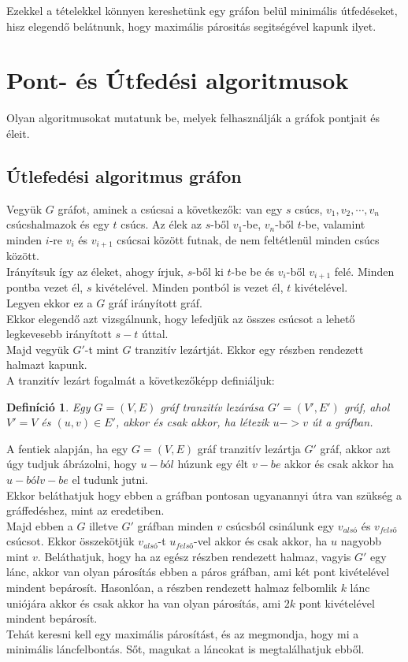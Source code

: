 \documentclass[12pt]{article}
\newtheorem{defin}{Definíció}[section]
\begin{document}
Ezekkel a tételekkel könnyen kereshetünk egy gráfon belül minimális útfedéseket, hisz elegendő belátnunk, hogy maximális párositás segitségével kapunk ilyet.


\section{Pont- és Útfedési algoritmusok}

Olyan algoritmusokat mutatunk be, melyek felhasználják a gráfok pontjait és éleit.

\subsection{Útlefedési algoritmus gráfon}

Vegyük $G$ gráfot, aminek a csúcsai a következők:
van egy $s$ csúcs, $v_1, v_2, \cdots, v_n$ csúcshalmazok és egy $t$ csúcs.
Az élek az $s$-ből $v_1$-be, $v_n$-ből $t$-be, valamint minden $i$-re $v_i$ és $v_{i+1}$ csúcsai között futnak, de nem feltétlenül minden csúcs között.\\
Irányítsuk így az éleket, ahogy írjuk, $s$-ből ki $t$-be be és $v_i$-ből $v_{i+1}$ felé. Minden pontba vezet él, $s$ kivételével. Minden pontból is vezet él, $t$ kivételével.\\
Legyen ekkor ez a $G$ gráf irányított gráf.\\
Ekkor elegendő azt vizsgálnunk, hogy lefedjük az összes csúcsot a lehető legkevesebb irányított $s-t$ úttal.\\
Majd vegyük $G'$-t mint $G$ tranzitív lezártját. Ekkor egy részben rendezett halmazt kapunk.\\

A tranzitív lezárt fogalmát a következőképp definiáljuk:

\begin{defin}
Egy $G = (V,E)$ gráf tranzitív lezárása $G' = (V',E')$ gráf, ahol $V' = V$ és $(u,v) \in E'$, akkor és csak akkor, ha létezik $u -> v$ út a gráfban.
\end{defin}

A fentiek alapján, ha egy $G = (V,E)$ gráf tranzitív lezártja $G'$ gráf, akkor azt úgy tudjuk ábrázolni, hogy $u-ból$ húzunk egy élt $v-be$ akkor és csak akkor ha $u-ból v-be$ el tudunk jutni.\\

Ekkor beláthatjuk hogy ebben a gráfban pontosan ugyanannyi útra van szükség a gráffedéshez, mint az eredetiben.\\
Majd ebben a $G$ illetve $G'$ gráfban minden $v$ csúcsból csinálunk egy $v_{alsó}$ és $v_{felső}$ csúcsot.
Ekkor összekötjük $v_{alsó}$-t $u_{felső}$-vel akkor és csak akkor, ha $u$ nagyobb mint $v$. Beláthatjuk, hogy ha az egész részben rendezett halmaz, vagyis $G'$ egy lánc, akkor van olyan párosítás ebben a páros gráfban, ami két pont kivételével mindent bepárosít.
Hasonlóan, a részben rendezett halmaz felbomlik $k$ lánc uniójára akkor és csak akkor ha van olyan párosítás, ami $2k$ pont kivételével mindent bepárosít.\\
Tehát keresni kell egy maximális párosítást, és az megmondja, hogy mi a minimális láncfelbontás. Sőt, magukat a láncokat is megtalálhatjuk ebből.
\end{document}
